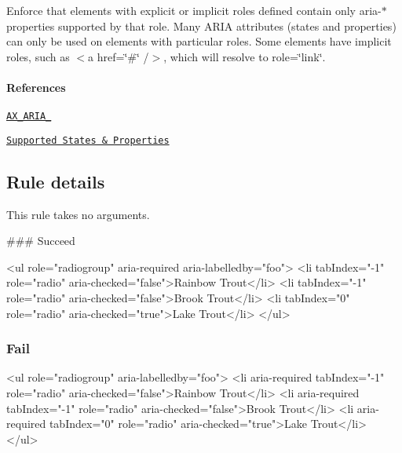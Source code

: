 Enforce that elements with explicit or implicit roles defined contain only {\ttfamily aria-\/$\ast$} properties supported by that {\ttfamily role}. Many A\+R\+IA attributes (states and properties) can only be used on elements with particular roles. Some elements have implicit roles, such as {\ttfamily $<$a href=\char`\"{}\#\char`\"{} /$>$}, which will resolve to {\ttfamily role=\char`\"{}link\char`\"{}}.

\paragraph*{References}


\begin{DoxyEnumerate}
\item \href{https://github.com/GoogleChrome/accessibility-developer-tools/wiki/Audit-Rules#ax_aria_10}{\tt A\+X\+\_\+\+A\+R\+I\+A\+\_}
\item \href{https://www.w3.org/TR/wai-aria/roles#supportedState}{\tt Supported States \& Properties}
\end{DoxyEnumerate}

\subsection*{Rule details}

This rule takes no arguments.

\#\#\# Succeed 
\begin{DoxyCode}
<ul role="radiogroup" aria-required aria-labelledby="foo">
    <li tabIndex="-1" role="radio" aria-checked="false">Rainbow Trout</li>
    <li tabIndex="-1" role="radio" aria-checked="false">Brook Trout</li>
    <li tabIndex="0" role="radio" aria-checked="true">Lake Trout</li>
</ul>
\end{DoxyCode}


\subsubsection*{Fail}


\begin{DoxyCode}
<ul role="radiogroup" aria-labelledby="foo">
    <li aria-required tabIndex="-1" role="radio" aria-checked="false">Rainbow Trout</li>
    <li aria-required tabIndex="-1" role="radio" aria-checked="false">Brook Trout</li>
    <li aria-required tabIndex="0" role="radio" aria-checked="true">Lake Trout</li>
</ul>
\end{DoxyCode}
 